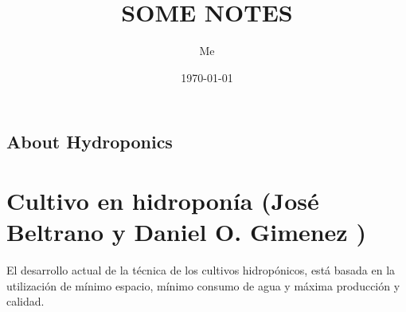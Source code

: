 \documentclass{report}
\title{SOME NOTES}
\author{Me}
\date{\today}
\begin{document}
\section{About Hydroponics}

\chapter{Cultivo en hidroponía (José Beltrano y Daniel O. Gimenez )}

El desarrollo actual de la técnica de los cultivos hidropónicos, está basada en la utilización de mínimo espacio, mínimo consumo de agua y máxima producción y calidad.
\end{document}
